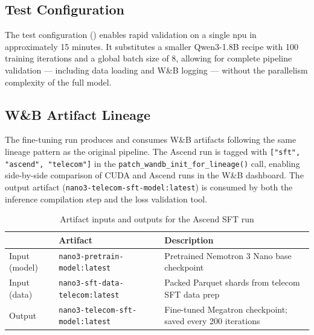 \subsection{Test Configuration}
\label{sec:test-config}

The test configuration () enables
rapid validation on a single \acrshort{npu} in approximately
15 minutes. It substitutes a smaller Qwen3-1.8B recipe with 100 training
iterations and a global batch size of 8, allowing for complete pipeline
validation — including data loading and W\&B logging — without the
parallelism complexity of the full model.

\subsection{W\&B Artifact Lineage}
\label{sec:loss-validation}

The fine-tuning run produces and consumes W\&B artifacts following
the same lineage pattern as the original pipeline. The Ascend
run is tagged with \texttt{["sft", "ascend", "telecom"]} in the
\texttt{patch\_wandb\_init\_for\_lineage()} call, enabling side-by-side
comparison of CUDA and Ascend runs in the W\&B dashboard. The
output artifact (\texttt{nano3-telecom-sft-model:latest}) is
consumed by both the inference compilation step and the loss
validation tool.

\begin{table}[htbp]
  \centering
  \caption{Artifact inputs and outputs for the Ascend SFT run}
  \label{tab:ascend-sft-artifacts}
  \begin{tabularx}{\textwidth}{llX}
    \toprule
    \tableheader{Direction & Artifact & Description} \\
    \midrule
    Input (model)
      & \texttt{nano3-pretrain-model:latest}
      & Pretrained Nemotron 3 Nano base checkpoint \\
    \rowcolor{TableRowOdd}
    Input (data)
      & \texttt{nano3-sft-data-telecom:latest}
      & Packed Parquet shards from telecom SFT data prep \\
    Output
      & \texttt{nano3-telecom-sft-model:latest}
      & Fine-tuned Megatron checkpoint; saved every 200 iterations \\
    \bottomrule
  \end{tabularx}
\end{table}
